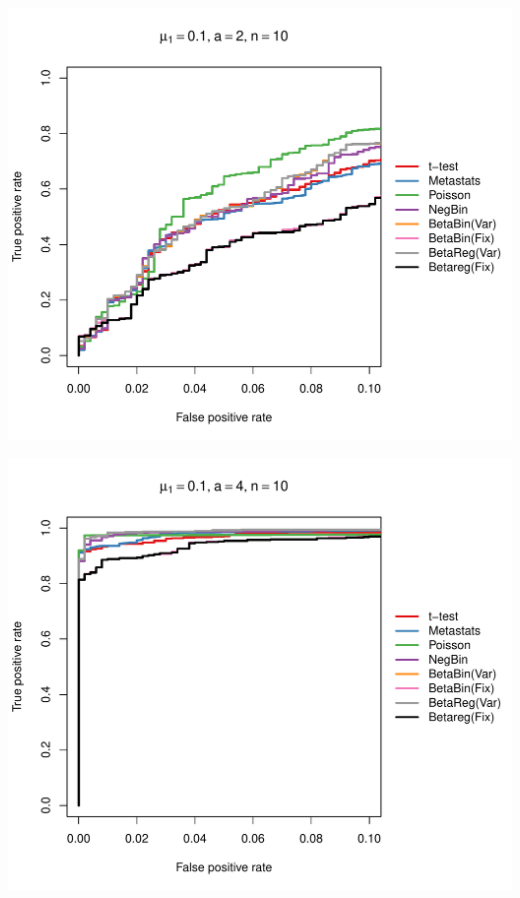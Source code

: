 \documentclass[12pt]{article}\usepackage{graphicx, color}
\makeatletter
\def\maxwidth{ %
  \ifdim\Gin@nat@width>\linewidth
    \linewidth
  \else
    \Gin@nat@width
  \fi
}
\newenvironment{knitrout}{}{} %
\makeatother
\begin{document}
\begin{knitrout}
{\centering \includegraphics[width=\maxwidth]{figure/rocs53} 

}




{\centering \includegraphics[width=\maxwidth]{figure/rocs54} 

}





\end{knitrout}
\end{document}
